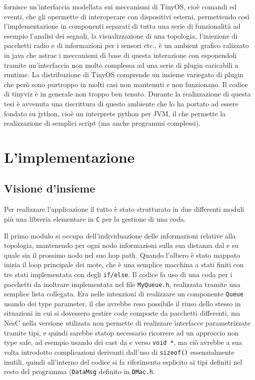 \documentclass[twoside,11pt,a4paper,italian,openany]{book}
\begin{document}
\tos fornisce un'interfaccia modellata sui meccanismi di TinyOS, cioè comandi ed eventi, 
che gli opermette di interoperare con dispositivi esterni, permettendo così l'implementazione in componenti separati di tutta una serie di funzionalità ad esempio l'analisi dei segnali, la visualizzazione di una topologia, l'iniezione di pacchetti radio e di informazioni per i sensori etc.. 
\tv è un ambient grafico ralizzato in java che astrae i meccanismi di base di questa interazione 
con \tos esponendoli tramite un'interfaccia non molto complessa ad una serie di plugin 
caricabili a runtime.  La distribuzione di TinyOS comprende un insieme variegato di plugin che 
però sono purtroppo in molti casi non mantenuti e non funzionano. Il codice di tinyviz è 
in generale non troppo ben tenuto. 
Durante la realizzazione di questa tesi è avvenuta una riscrittura di questo ambiente che lo ha 
portato ad essere fondato su jython\cite{tython}, cioè un interprete python per JVM, 
il che permette la realizzazione di semplici script (ma anche programmi complessi).
 

\chapter{L'implementazione}
\section{Visione d'insieme}
Per realizzare l'applicazione il tutto è stato strutturato in due differenti moduli più 
una libreria elementare in \texttt{C} per la gestione di una coda.

Il primo modulo si occupa dell'individuazione delle informazioni relative alla topologia, 
mantenendo per ogni nodo informazioni sulla sua distanza dal \sink e su quale sia il prossimo 
nodo nel suo hop path.  
Quando l'albero è stato mappato inizia il loop principale dei mote, che è una 
semplice macchina a stati finiti con tre stati implementata con degli \texttt{if/else}.
Il codice fa uso di una coda per i pacchetti da inoltrare implementata nel file \texttt{MyQueue.h}, realizzata tramite una semplice lista collegata.
Era nelle intenzioni di realizzare un componente \texttt{Queue} usando dei type parameter, 
il che avrebbe reso possibile il riuso dello stesso in situazioni in cui si dovessero gestire 
code composte da pacchetti differenti, ma NesC nella versione utilizata non permette di 
realizzare interfacce parametrizzate tramite tipi, e quindi sarebbe statop necessario ricorrere 
ad un approccio non type safe, ad esempio usando dei cast da e verso \texttt{void *}, ma ciò avrebbe a sua volta introdotto complicazioni derivanti dall'uso di \texttt{sizeof()} essenzialmente inutili, quindi all'interno del codice si fa riferimento esplicito ai tipi definiti nel resto 
del programma (\texttt{DataMsg} definito in \texttt{DMac.h}.
\end{document}
